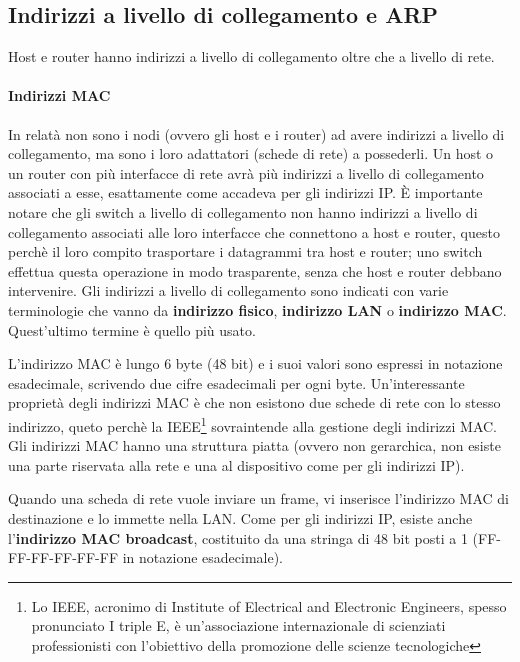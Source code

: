 \documentclass[11pt,a4paper]{book}
\begin{document}
\subsection{Indirizzi a livello di collegamento e ARP}
Host e router hanno indirizzi a livello di collegamento oltre che a livello di rete.
\paragraph{Indirizzi MAC}
In relatà non sono i nodi (ovvero gli host e i router) ad avere indirizzi a livello di collegamento, ma sono i loro adattatori (schede di rete) a possederli. Un host o un router con più interfacce di rete avrà più indirizzi a livello di collegamento associati a esse, esattamente come accadeva per gli indirizzi IP. È importante notare che gli switch a livello di collegamento non hanno indirizzi a livello di collegamento associati alle loro interfacce che connettono a host e router, questo perchè il loro compito  trasportare i datagrammi tra host e router; uno switch effettua questa operazione in modo trasparente, senza che host e router debbano intervenire. Gli indirizzi a livello di collegamento sono indicati con varie terminologie che vanno da \textbf{indirizzo fisico}, \textbf{indirizzo LAN} o \textbf{indirizzo MAC}. Quest'ultimo termine è quello più usato.

L'indirizzo MAC è lungo 6 byte (48 bit) e i suoi valori sono espressi in notazione esadecimale, scrivendo due cifre esadecimali per ogni byte. Un'interessante proprietà degli indirizzi MAC è che non esistono due schede di rete con lo stesso indirizzo, queto perchè la IEEE\footnote{Lo IEEE, acronimo di Institute of Electrical and Electronic Engineers, spesso pronunciato I triple E, è un'associazione internazionale di scienziati professionisti con l'obiettivo della promozione delle scienze tecnologiche} sovraintende alla gestione degli indirizzi MAC. Gli indirizzi MAC hanno una struttura piatta (ovvero non gerarchica, non esiste una parte riservata alla rete e una al dispositivo come per gli indirizzi IP).

Quando una scheda di rete vuole inviare un frame, vi inserisce l'indirizzo MAC di destinazione e lo immette nella LAN. Come per gli indirizzi IP, esiste anche l'\textbf{indirizzo MAC broadcast}, costituito da una stringa di 48 bit posti a 1 (FF-FF-FF-FF-FF-FF in notazione esadecimale).
\end{document}
